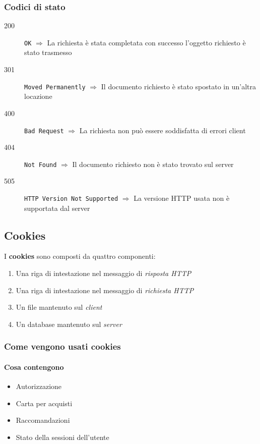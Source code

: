         \subsubsection{Codici di stato}
        \begin{description}
            \item[200] \texttt{OK} $\Rightarrow$ La richiesta è stata completata con successo l'oggetto richiesto è stato trasmesso
            \item[301] \texttt{Moved Permanently} $\Rightarrow$  Il documento richiesto è stato spostato in un'altra locazione
            \item[400] \texttt{Bad Request} $\Rightarrow$ La richiesta non può essere soddisfatta di errori client
            \item[404] \texttt{Not Found} $\Rightarrow$ Il documento richiesto non è stato trovato sul server
            \item[505] \texttt{HTTP Version Not Supported} $\Rightarrow$ La versione \Acrshort*{HTTP} usata non è supportata dal server
        \end{description}
    \subsection{Cookies}
        I \textbf{cookies} sono composti da quattro componenti:
        \begin{enumerate}
            \item Una riga di intestazione nel messaggio di \textit{risposta \Acrshort*{HTTP}}
            \item Una riga di intestazione nel messaggio di \textit{richiesta \Acrshort*{HTTP}}
            \item Un file mantenuto sul \textit{client}
            \item Un database mantenuto sul \textit{server}
        \end{enumerate}
        \subsubsection{Come vengono usati cookies}
            \paragraph{Cosa contengono}
                \begin{itemize}
                    \item Autorizzazione
                    \item Carta per acquisti
                    \item Raccomandazioni
                    \item Stato della sessioni dell'utente
                \end{itemize}

